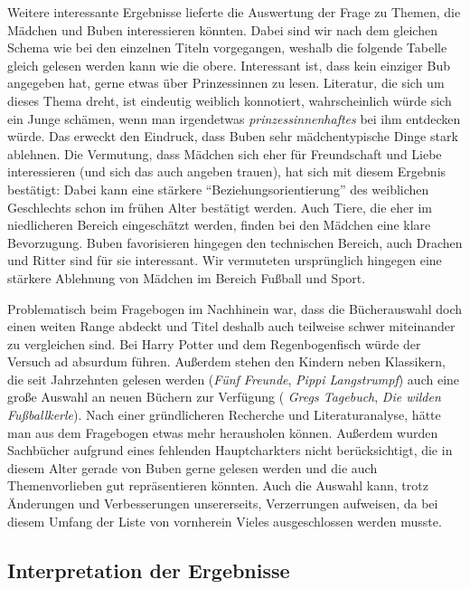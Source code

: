 Weitere interessante Ergebnisse lieferte die Auswertung der Frage zu
Themen, die Mädchen und Buben interessieren könnten. Dabei sind wir nach
dem gleichen Schema wie bei den einzelnen Titeln vorgegangen, weshalb
die folgende Tabelle gleich gelesen werden kann wie die obere.
Interessant ist, dass kein einziger Bub angegeben hat, gerne etwas über
Prinzessinnen zu lesen. Literatur, die sich um dieses Thema dreht, ist
eindeutig weiblich konnotiert, wahrscheinlich würde sich ein Junge
schämen, wenn man irgendetwas \emph{prinzessinnenhaftes} bei ihm
entdecken würde. Das erweckt den Eindruck, dass Buben sehr
mädchentypische Dinge stark ablehnen. Die Vermutung, dass Mädchen sich
eher für Freundschaft und Liebe interessieren (und sich das auch angeben
trauen), hat sich mit diesem Ergebnis bestätigt: Dabei kann eine
stärkere ``Beziehungsorientierung'' des weiblichen Geschlechts schon im
frühen Alter bestätigt werden. Auch Tiere, die eher im niedlicheren
Bereich eingeschätzt werden, finden bei den Mädchen eine klare
Bevorzugung. Buben favorisieren hingegen den technischen Bereich, auch
Drachen und Ritter sind für sie interessant. Wir vermuteten ursprünglich
hingegen eine stärkere Ablehnung von Mädchen im Bereich Fußball und
Sport.



Problematisch beim Fragebogen im Nachhinein war, dass die Bücherauswahl
doch einen weiten Range abdeckt und Titel deshalb auch teilweise schwer
miteinander zu vergleichen sind. Bei Harry Potter und dem
Regenbogenfisch würde der Versuch ad absurdum führen. Außerdem stehen
den Kindern neben Klassikern, die seit Jahrzehnten gelesen werden
(\emph{Fünf Freunde}, \emph{Pippi Langstrumpf}) auch eine große Auswahl
an neuen Büchern zur Verfügung ( \emph{Gregs Tagebuch}, \emph{Die wilden
Fußballkerle}). Nach einer gründlicheren Recherche und Literaturanalyse,
hätte man aus dem Fragebogen etwas mehr herausholen können. Außerdem
wurden Sachbücher aufgrund eines fehlenden Hauptcharkters nicht
berücksichtigt, die in diesem Alter gerade von Buben gerne gelesen
werden und die auch Themenvorlieben gut repräsentieren könnten. Auch die
Auswahl kann, trotz Änderungen und Verbesserungen unsererseits,
Verzerrungen aufweisen, da bei diesem Umfang der Liste von vornherein
Vieles ausgeschlossen werden musste.

\subsection{Interpretation der Ergebnisse}

